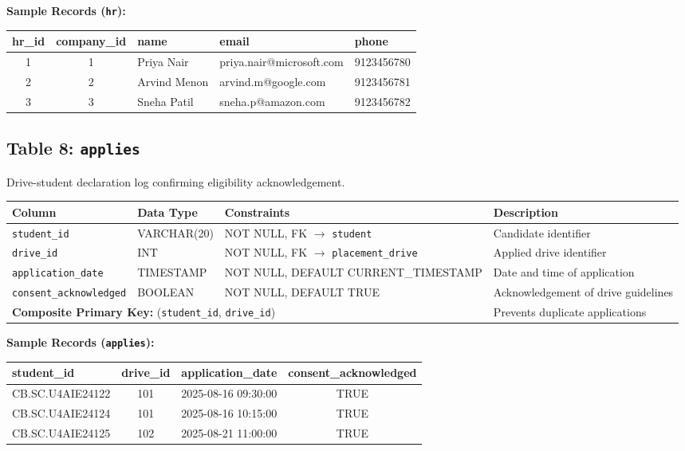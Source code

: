 \documentclass[11pt,a4paper]{article}
\begin{document}
\textbf{Sample Records (\texttt{hr}):}
\begin{table}[H]
    \centering
    \scriptsize
    \begin{tabularx}{\textwidth}{c c l l l}
        \toprule
        \textbf{hr\_id} & \textbf{company\_id} & \textbf{name} & \textbf{email} & \textbf{phone} \\
        \midrule
        1 & 1 & Priya Nair & priya.nair@microsoft.com & 9123456780 \\
        2 & 2 & Arvind Menon & arvind.m@google.com & 9123456781 \\
        3 & 3 & Sneha Patil & sneha.p@amazon.com & 9123456782 \\
        \bottomrule
    \end{tabularx}
\end{table}

\subsection{Table 8: \texttt{applies}}
Drive-student declaration log confirming eligibility acknowledgement.

\begin{table}[H]
    \centering
    \footnotesize
    \begin{tabularx}{\textwidth}{l l l X}
        \toprule
        \textbf{Column} & \textbf{Data Type} & \textbf{Constraints} & \textbf{Description} \\
        \midrule
        \texttt{student\_id} & VARCHAR(20) & NOT NULL, FK \(\to\) \texttt{student} & Candidate identifier \\
        \texttt{drive\_id} & INT & NOT NULL, FK \(\to\) \texttt{placement\_drive} & Applied drive identifier \\
        \texttt{application\_date} & TIMESTAMP & NOT NULL, DEFAULT CURRENT\_TIMESTAMP & Date and time of application \\
        \texttt{consent\_acknowledged} & BOOLEAN & NOT NULL, DEFAULT TRUE & Acknowledgement of drive guidelines \\
        \multicolumn{3}{l}{\textbf{Composite Primary Key:} (\texttt{student\_id}, \texttt{drive\_id})} & Prevents duplicate applications \\
        \bottomrule
    \end{tabularx}
\end{table}

\textbf{Sample Records (\texttt{applies}):}
\begin{table}[H]
    \centering
    \scriptsize
    \begin{tabularx}{\textwidth}{l c l c}
        \toprule
        \textbf{student\_id} & \textbf{drive\_id} & \textbf{application\_date} & \textbf{consent\_acknowledged} \\
        \midrule
        CB.SC.U4AIE24122 & 101 & 2025-08-16 09:30:00 & TRUE \\
        CB.SC.U4AIE24124 & 101 & 2025-08-16 10:15:00 & TRUE \\
        CB.SC.U4AIE24125 & 102 & 2025-08-21 11:00:00 & TRUE \\
        \bottomrule
    \end{tabularx}
\end{table}
\end{document}
